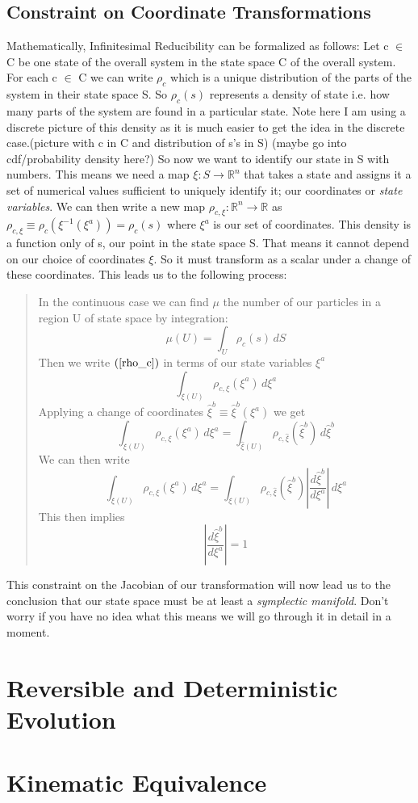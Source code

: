 \documentclass{article}
\begin{document}
\subsection{Constraint on Coordinate Transformations}
	Mathematically, Infinitesimal Reducibility can be formalized as follows: Let c $\in$ C be one state of the overall system in the state space C of the overall system. For each c $\in$ C we can write $\rho_c$ which is a unique distribution of the parts of the system in their state space S. So $\rho_c(s)$ represents a density of state i.e. how many parts of the system are found in a particular state. Note here I am using a discrete picture of this density as it is much easier to get the idea in the discrete case.(picture with c in C and distribution of s's in S) (maybe go into cdf/probability density here?) So now we want to identify our state in S with numbers. This means we need a map $\xi : S \rightarrow \mathbb{R}^n $ that takes a state and assigns it a set of numerical values sufficient to uniquely identify it; our coordinates or \textit{state variables}. We can then write a new map $\rho_{c,\xi} : \mathbb{R}^n \rightarrow \mathbb{R}$ as $\rho_{c,\xi} \equiv \rho_c(\xi^{-1}(\xi^a)) = \rho_c(s)$ where $\xi^a$ is our set of coordinates. This density is a function only of s, our point in the state space S. That means it cannot depend on our choice of coordinates $\xi$. So it must transform as a scalar under a change of these coordinates. This leads us to the following process:
\begin{quote}
In the continuous case we can find $\mu$ the number of our particles in a region U of state space by integration:
	\begin{equation}
	\label{rho_c}
	\mu(U) = \int_{U} \rho_c(s)\, dS
	\end{equation}
Then we write $(\ref{rho_c})$ in terms of our state variables $\xi^a$ 
	\begin{equation}
	\label{rho_xia}
	\int_{\xi(U)} \rho_{c,\xi}(\xi^a) \, d\xi^a
	\end{equation}
Applying a change of coordinates $\hat{\xi}^b \equiv \hat{\xi}^b(\xi^a)$ we get
	\begin{equation}
	\label{rho_xib}
	\int_{\xi(U)} \rho_{c,\xi}(\xi^a) \, d\xi^a = \int_{\hat{\xi}(U)} \rho_{c,\hat{\xi}}(\hat{\xi}^b) \, d\hat{\xi}^b
	\end{equation}
We can then write
	\begin{equation}
	\label{rho_J}
	\int_{\xi(U)} \rho_{c,\xi}(\xi^a) \, d\xi^a = \int_{\xi(U)} \rho_{c,\hat{\xi}}(\hat{\xi}^b) |\frac{d\hat{\xi}^b}{d\xi^a}| \, d\xi^a
	\end{equation}
This then implies
	\begin{equation}
	\label{}
	|\frac{d\hat{\xi}^b}{d\xi^a}| = 1
	\end{equation}
\end{quote}
This constraint on the Jacobian of our transformation will now lead us to the conclusion that our state space must be at least a \textit{symplectic manifold}. Don't worry if you have no idea what this means we will go through it in detail in a moment.

\section{Reversible and Deterministic Evolution}

\section{Kinematic Equivalence}
\end{document}
